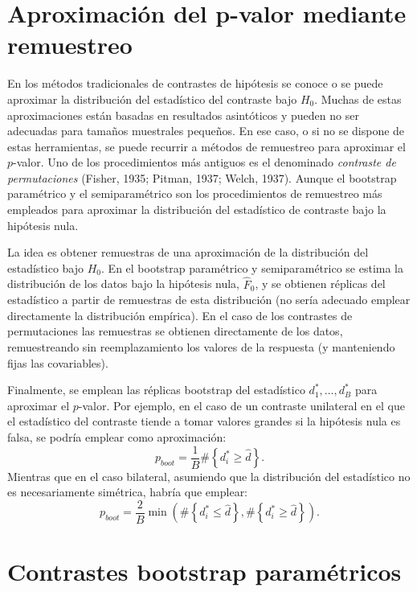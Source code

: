 \documentclass[
]{book}
\theoremstyle{break}
\theoremstyle{definition}
\theoremstyle{definition}
\theoremstyle{definition}
\theoremstyle{remark}
\begin{document}
\hypertarget{aproximaciuxf3n-del-p-valor-mediante-remuestreo}{%
\section{Aproximación del p-valor mediante remuestreo}\label{aproximaciuxf3n-del-p-valor-mediante-remuestreo}}

En los métodos tradicionales de contrastes de hipótesis se conoce o se
puede aproximar la distribución del estadístico del contraste bajo \(H_0\).
Muchas de estas aproximaciones están basadas en resultados asintóticos
y pueden no ser adecuadas para tamaños muestrales pequeños.
En ese caso, o si no se dispone de estas herramientas,
se puede recurrir a métodos de remuestreo para aproximar el \(p\)-valor.
Uno de los procedimientos más antiguos es el denominado
\emph{contraste de permutaciones} (Fisher, 1935; Pitman, 1937; Welch, 1937).
Aunque el bootstrap paramétrico y el semiparamétrico son los
procedimientos de remuestreo más empleados para aproximar
la distribución del estadístico de contraste bajo la hipótesis nula.

La idea es obtener remuestras de una aproximación de la distribución del
estadístico bajo \(H_0\).
En el bootstrap paramétrico y semiparamétrico se estima la distribución
de los datos bajo la hipótesis nula, \(\hat{F}_0\), y se obtienen réplicas del
estadístico a partir de remuestras de esta distribución (no sería adecuado
emplear directamente la distribución empírica).
En el caso de los contrastes de permutaciones las remuestras se obtienen
directamente de los datos, remuestreando sin reemplazamiento los valores
de la respuesta (y manteniendo fijas las covariables).

Finalmente, se emplean las réplicas bootstrap
del estadístico \(d_1^{\ast},\ldots, d_B^{\ast}\) para aproximar el \(p\)-valor.
Por ejemplo, en el caso de un contraste unilateral en el que el estadístico del
contraste tiende a tomar valores grandes si la hipótesis nula es falsa,
se podría emplear como aproximación:
\[p_{boot} = \frac{1}{B}\#\left\{ d_i^{\ast} \geq \hat{d} \right\}.\]
Mientras que en el caso bilateral, asumiendo que la distribución del estadístico
no es necesariamente simétrica, habría que emplear:
\[p_{boot} = \frac{2}{B} \min \left(\#\left\{ d_i^{\ast} \leq \hat{d} \right\},
\#\left\{ d_i^{\ast} \geq \hat{d} \right\}\right).\]

\hypertarget{contrastes-parametricos}{%
\section{Contrastes bootstrap paramétricos}\label{contrastes-parametricos}}
\end{document}
